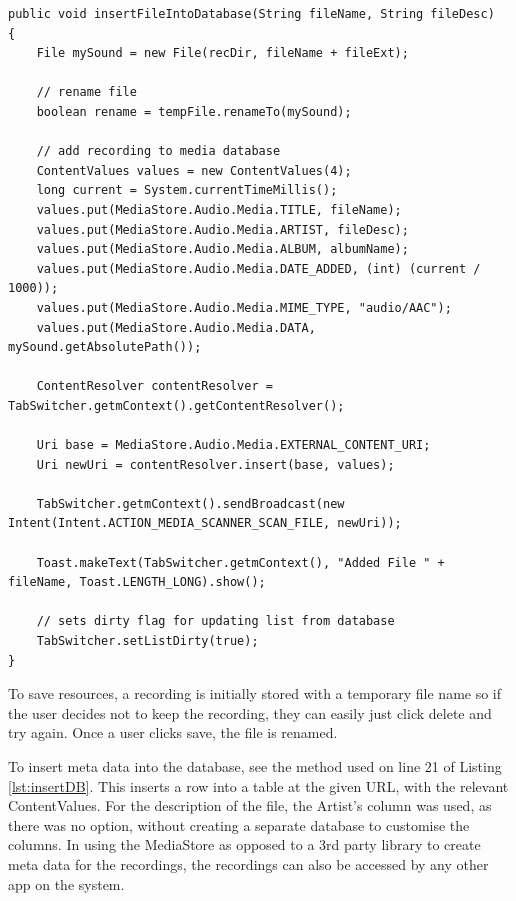 \documentclass[conference]{acmsiggraph}
\begin{document}

\begin{lstlisting}[label = {lst:insertDB}, caption={Inserting File into MediaStore Database}]
public void insertFileIntoDatabase(String fileName, String fileDesc)
{
    File mySound = new File(recDir, fileName + fileExt);
    	
    // rename file
    boolean rename = tempFile.renameTo(mySound);
    	
   	// add recording to media database
   	ContentValues values = new ContentValues(4);
   	long current = System.currentTimeMillis();
   	values.put(MediaStore.Audio.Media.TITLE, fileName);
   	values.put(MediaStore.Audio.Media.ARTIST, fileDesc);
   	values.put(MediaStore.Audio.Media.ALBUM, albumName);
   	values.put(MediaStore.Audio.Media.DATE_ADDED, (int) (current / 1000));
    values.put(MediaStore.Audio.Media.MIME_TYPE, "audio/AAC");
   	values.put(MediaStore.Audio.Media.DATA, mySound.getAbsolutePath());
    	
   	ContentResolver contentResolver = TabSwitcher.getmContext().getContentResolver();
    	
   	Uri base = MediaStore.Audio.Media.EXTERNAL_CONTENT_URI;
   	Uri newUri = contentResolver.insert(base, values);
    	
   	TabSwitcher.getmContext().sendBroadcast(new Intent(Intent.ACTION_MEDIA_SCANNER_SCAN_FILE, newUri));
   	
   	Toast.makeText(TabSwitcher.getmContext(), "Added File " + fileName, Toast.LENGTH_LONG).show();
    	
   	// sets dirty flag for updating list from database
   	TabSwitcher.setListDirty(true);
}
\end{lstlisting}




To save resources, a recording is initially stored with a temporary file name so if the user decides not to keep the recording, they can easily just click delete and try again. Once a user clicks save, the file is renamed.

To insert meta data into the database, see the method used on line 21 of Listing \ref{lst:insertDB}. This inserts a row into a table at the given URL, with the relevant ContentValues. For the description of the file, the Artist's column was used, as there was no option, without creating a separate database to customise the columns. In using the MediaStore as opposed to a 3rd party library to create meta data for the recordings, the recordings can also be accessed by any other app on the system.
\end{document}

